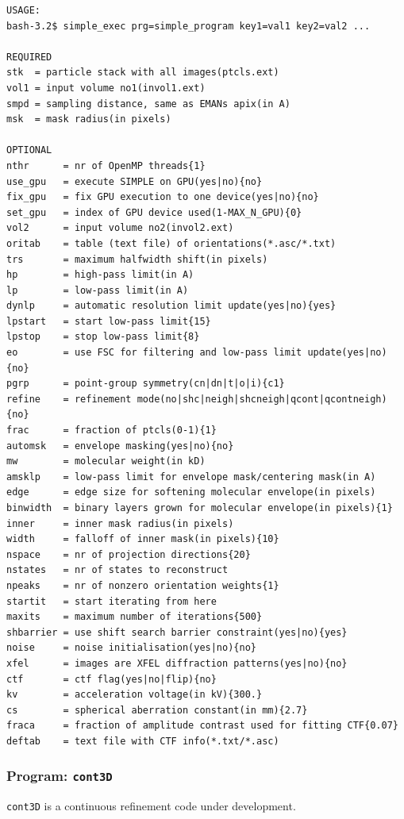 \documentclass[a4paper,11pt]{article}
\newcommand{\prgname}[1]{\textcolor{NavyBlue}{\texttt{#1}}}
\begin{document}
\begin{verbatim}
USAGE:
bash-3.2$ simple_exec prg=simple_program key1=val1 key2=val2 ...

REQUIRED
stk  = particle stack with all images(ptcls.ext)
vol1 = input volume no1(invol1.ext)
smpd = sampling distance, same as EMANs apix(in A)
msk  = mask radius(in pixels)

OPTIONAL
nthr      = nr of OpenMP threads{1}
use_gpu   = execute SIMPLE on GPU(yes|no){no}
fix_gpu   = fix GPU execution to one device(yes|no){no}
set_gpu   = index of GPU device used(1-MAX_N_GPU){0}
vol2      = input volume no2(invol2.ext)
oritab    = table (text file) of orientations(*.asc/*.txt)
trs       = maximum halfwidth shift(in pixels)
hp        = high-pass limit(in A)
lp        = low-pass limit(in A)
dynlp     = automatic resolution limit update(yes|no){yes}
lpstart   = start low-pass limit{15}
lpstop    = stop low-pass limit{8}
eo        = use FSC for filtering and low-pass limit update(yes|no){no}
pgrp      = point-group symmetry(cn|dn|t|o|i){c1}
refine    = refinement mode(no|shc|neigh|shcneigh|qcont|qcontneigh){no}
frac      = fraction of ptcls(0-1){1}
automsk   = envelope masking(yes|no){no}
mw        = molecular weight(in kD)
amsklp    = low-pass limit for envelope mask/centering mask(in A)
edge      = edge size for softening molecular envelope(in pixels)
binwidth  = binary layers grown for molecular envelope(in pixels){1}
inner     = inner mask radius(in pixels)
width     = falloff of inner mask(in pixels){10}
nspace    = nr of projection directions{20}
nstates   = nr of states to reconstruct
npeaks    = nr of nonzero orientation weights{1}
startit   = start iterating from here
maxits    = maximum number of iterations{500}
shbarrier = use shift search barrier constraint(yes|no){yes}
noise     = noise initialisation(yes|no){no}
xfel      = images are XFEL diffraction patterns(yes|no){no}
ctf       = ctf flag(yes|no|flip){no}
kv        = acceleration voltage(in kV){300.}
cs        = spherical aberration constant(in mm){2.7}
fraca     = fraction of amplitude contrast used for fitting CTF{0.07}
deftab    = text file with CTF info(*.txt/*.asc)
\end{verbatim}

\subsubsection{Program: \prgname{cont3D}}
\label{cont3D}
\prgname{cont3D} is a continuous refinement code under development.
\end{document}
